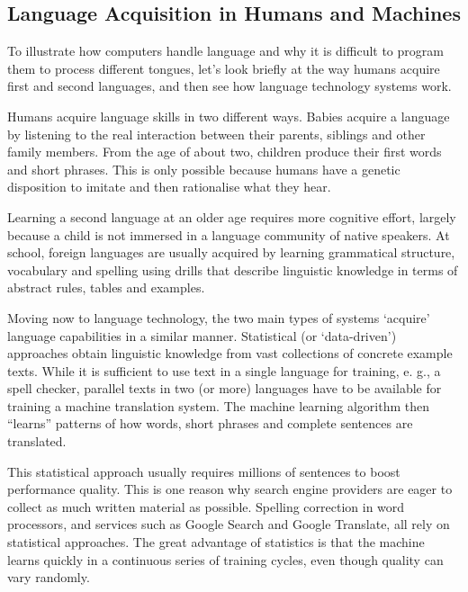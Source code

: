\begin{multicols}{2}
\subsection{Language Acquisition in Humans and Machines}

To illustrate how computers handle language and why it is difficult to program them to process different tongues, let’s look briefly at the way humans acquire first and second languages, and then see how language technology systems work.

Humans acquire language skills in two different ways. Babies acquire a language by listening to the real interaction between their parents, siblings and other family members. From the age of about two, children produce their first words and short phrases. This is only possible because humans have a genetic disposition to imitate and then rationalise what they hear.

Learning a second language at an older age requires more cognitive effort,  largely because a child is not immersed in a language community of native speakers. At school, foreign languages are usually acquired by learning grammatical structure, vocabulary and spelling using drills that describe linguistic knowledge in terms of abstract rules, tables and examples.


Moving now to language technology, the two main types of systems ‘acquire’ language capabilities in a similar manner. Statistical (or ‘data-driven’) approaches obtain linguistic knowledge from vast collections of concrete example texts. While it is sufficient to use text in a single language for training, e. g., a spell checker, parallel texts in two (or more) languages have to be available for training a machine translation system. The machine learning algorithm then “learns” patterns of how words, short phrases and complete sentences are translated. 

This statistical approach usually requires millions of sentences to boost performance quality. This is one reason why search engine providers are eager to collect as much written material as possible. Spelling correction in word processors, and services such as Google Search and Google Translate, all rely on statistical approaches. The great advantage of statistics is that the machine learns quickly in a continuous series of training cycles, even though quality can vary randomly.


\end{multicols}
